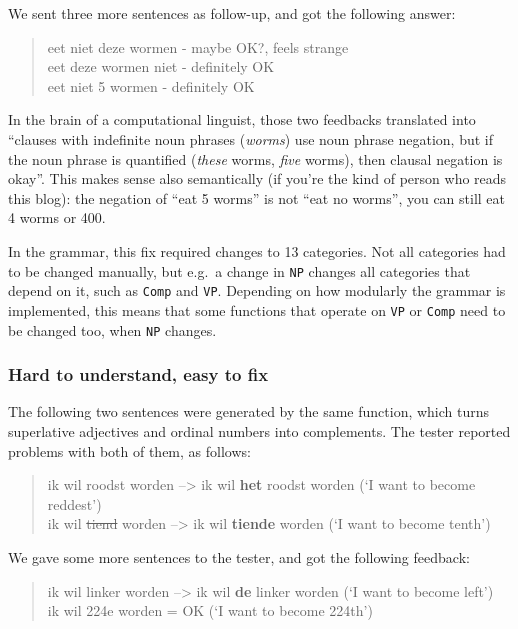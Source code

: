 \noindent We sent three more sentences as follow-up, and got the
following answer:

\begin{quote}
eet niet deze wormen - maybe OK?, feels strange\\eet deze wormen niet -
definitely OK\\eet niet 5 wormen - definitely OK
\end{quote}

In the brain of a computational linguist, those two feedbacks translated
into ``clauses with indefinite noun phrases (\emph{worms}) use noun
phrase negation, but if the noun phrase is quantified (\emph{these}
worms, \emph{five} worms), then clausal negation is okay''. This makes
sense also semantically (if you're the kind of person who reads this
blog): the negation of ``eat 5 worms'' is not ``eat no worms'', you can
still eat 4 worms or 400.

In the grammar, this fix required changes to 13 categories. Not all
categories had to be changed manually, but e.g.~a change in \texttt{NP}
changes all categories that depend on it, such as \texttt{Comp} and
\texttt{VP}. Depending on how modularly the grammar is implemented, this
means that some functions that operate on \texttt{VP} or \texttt{Comp}
need to be changed too, when \texttt{NP} changes.

\subsubsection{Hard to understand, easy to
fix}\label{hard-to-understand-easy-to-fix}

The following two sentences were generated by the same function, which
turns superlative adjectives and ordinal numbers into complements. The
tester reported problems with both of them, as follows:

\begin{quote}
ik wil roodst worden --\textgreater{} ik wil \textbf{het} roodst worden
(`I want to become reddest')\\ik wil \sout{tiend} worden
--\textgreater{} ik wil \textbf{tiende} worden (`I want to become
tenth')
\end{quote}

\noindent We gave some more sentences to the tester, and got the following
feedback:

\begin{quote}
ik wil linker worden --\textgreater{} ik wil \textbf{de} linker worden
(`I want to become left')\\ik wil 224e worden = OK (`I want to become
224th')
\end{quote}

